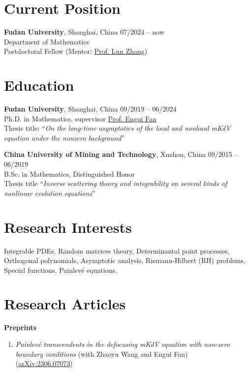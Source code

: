 \documentclass[margin]{res}
\begin{document}
\begin{resume}
\section{Current Position}
\textbf{Fudan University}, Shanghai, China \hfill 07/2024 -- now\\
Department of Mathematics \\
Postdoctoral Fellow  (Mentor: \href{https://lunzhangmaths.github.io}{Prof. Lun Zhang})


\section{Education}
\textbf{Fudan University}, Shanghai, China \hfill 09/2019 -- 06/2024\\
Ph.D. in Mathematics, supervisor \href{https://math.fudan.edu.cn/fa/25/c30607a326181/page.htm}{Prof. Engui Fan} \\
Thesis title: ``{\sl On the long-time asymptotics of the local and nonlocal mKdV equation under the nonzero background}''
\par

\textbf{China University of Mining and Technology}, Xuzhou, China \hfill 09/2015 -- 06/2019\\ 
B.Sc. in Mathematics, Distinguished Honor \\
Thesis title ``{\sl Inverse scattering theory and integrability on several kinds of nonlinear evolution equations}''


\section{Research Interests}
Integrable PDEs, Random matrices theory, Determinantal point processes, 
Orthogonal polynomials, Asymptotic analysis, Riemann-Hilbert (RH) problems, Special functions, 
Painlev\'e equations.

\section{Research Articles}
\textbf{Preprints}
\begin{enumerate}[1.]
    \item {\sl Painlev\'{e} transcendents in the defocusing mKdV equation with non-zero boundary conditions} (with Zhaoyu Wang and Engui Fan)\\
    (\href{https://arxiv.org/abs/2306.07073}{arXiv:2306.07073})
\end{enumerate}


\end{resume}
\end{document}
